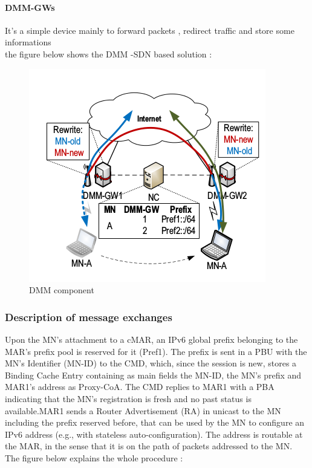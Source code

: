 \documentclass{article}
\begin{document}
\paragraph{DMM-GWs}
It's a simple device mainly to forward packets , redirect traffic and
store some informations\\
\newline
the figure below shows the DMM -SDN based solution : 

\begin{figure}[h!]
  \centering
    \includegraphics[scale=0.5]{reportPictures/figure6.png}
  \caption{DMM component}
\end{figure}

\subsubsection{Description of message exchanges}
Upon the MN's attachment to a cMAR, an IPv6 global prefix belonging to
the MAR's prefix pool is reserved for it (Pref1).  The prefix is sent
in a PBU with the MN's Identifier (MN-ID) to the CMD, which, since the
session is new, stores a Binding Cache Entry containing as main fields
the MN-ID, the MN's prefix and MAR1's address as Proxy-CoA. The CMD
replies to MAR1 with a PBA indicating that the MN's registration is
fresh and no past status is available.MAR1 sends a Router
Advertisement (RA) in unicast to the MN including the prefix reserved
before, that can be used by the MN to configure an IPv6 address (e.g.,
with stateless auto-configuration). The address is routable at the
MAR, in the sense that it is on the path of packets addressed to the
MN.\\
\newline
The figure below explains the whole procedure :
\end{document}
